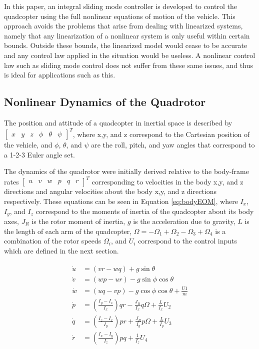 \documentclass[12pt]{article}
\begin{document}
In this paper, an integral sliding mode controller is developed to control the quadcopter using the full nonlinear equations of motion of the vehicle. This approach avoids the problems that arise from dealing with linearized systems, namely that any linearization of a nonlinear system is only useful within certain bounds. Outside these bounds, the linearized model would cease to be accurate and any control law applied in the situation would be useless. A nonlinear control law such as sliding mode control does not suffer from these same issues, and thus is ideal for applications such as this.

\subsection{Nonlinear Dynamics of the Quadrotor}
The position and attitude of a quadcopter in inertial space is described by $[\begin{matrix} x & y & z & \phi & \theta & \psi\end{matrix}]^T$, where x,y, and z correspond to the Cartesian position of the vehicle, and $\phi$, $\theta$, and $\psi$ are the roll, pitch, and yaw angles that correspond to a 1-2-3 Euler angle set.

The dynamics of the quadrotor were initially derived relative to the body-frame rates $[\begin{matrix} u & v & w & p & q & r\end{matrix}]^T$ corresponding to velocities in the body x,y, and z directions and angular velocities about the body x,y, and z directions respectively. These equations can be seen in Equation \ref{eq:bodyEOM}, where $I_x$, $I_y$, and $I_z$ correspond to the moments of inertia of the quadcopter about its body axes, $J_R$ is the rotor moment of inertia, $g$ is the acceleration due to gravity, $L$ is the length of each arm of the quadcopter, $\Omega = -\Omega_1 + \Omega_2 - \Omega_3 + \Omega_4$ is a combination of the rotor speeds $\Omega_i$, and $U_i$ correspond to the control inputs which are defined in the next section.

\begin{centering}
\begin{align} \label{eq:bodyEOM}
\begin{split}
\dot{u} &= (vr-wq) + g\sin\theta\\
\dot{v} &= (wp-ur)-g\sin\phi\cos\theta\\
\dot{w} &= (uq - vp) - g\cos\phi\cos\theta + \frac{U1}{m}\\
\dot{p} &= \left(\frac{I_y - I_z}{I_x}\right)qr - \frac{J_R}{I_x}q\Omega + \frac{L}{I_x}U_2\\
\dot{q} &= \left(\frac{I_z-I_x}{I_y}\right)pr + \frac{J_R}{I_y}p\Omega + \frac{L}{I_y}U_3\\
\dot{r} &= \left( \frac{I_x - I_y}{I_z} \right)pq + \frac{1}{I_z}U_4
\end{split}
\end{align}
\end{centering}
\end{document}
